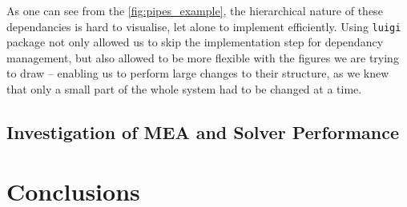 As one can see from the \autoref{fig:pipes_example}, the hierarchical nature of these dependancies is hard to visualise, let alone to implement efficiently.
Using {\tt luigi} package not only allowed us to skip the implementation step for dependancy management, but also allowed to be more flexible with the figures we are trying to draw -- enabling us to perform large changes to their structure, as we knew that only a small part of the whole system had to be changed at a time.

\subsection{Investigation of MEA and Solver Performance}

\section{Conclusions}


